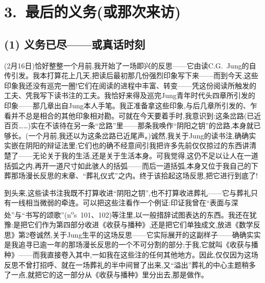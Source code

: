 
\section{3.~最后的义务(或那次来访)}

\subsection{(1) 义务已尽——或真话时刻}


\dmark{}(2月16日)恰好整整一个月前,我开始了一场即兴的反思——它由读C.G.~Jung的自传引发。我本打算花上几天,把读后最初那几份强烈印象写下来——而到今天,这些印象我还没有巡完一圈!它们在阅读的进程中丰富、转变——凭这份阅读所触发的工夫、凭我写下读书注的工夫。我恰好来得及巡完Jung青年时代头四章所引发的印象——那几章出自Jung本人手笔。我正准备拿这些印象,与后几章所引发的、乍看并不总是相合的其他印象相对勘。可就在今天要着手时,我意识到:这条岔路(已近百页……)实在不该待在另一条“岔路”里——那条我唤作“阴阳之钥”的岔路,本身就已够长。(一个月前,我还以为这条岔路已近尾声。)诚然,我关于Jung的读书注,确确实实嵌在阴阳的辩证法里;它们也的确不经意间引我把许多先前仅仅掠过的东西讲清楚了——无论关于我的生活,还是关于生活本身。可我觉得,这仍不足以让人在一道括弧之内,再开一道尺寸如此骇人的括弧——而后一道括弧,本身又位于我自己的下葬那场漫长反思的末章、“葬礼仪式”之内。终于该拾起这场反思,把它进行到底了!

到头来,这些读书注我既不打算收进“阴阳之钥”,也不打算收进葬礼——它与葬礼只有一线相当微弱的牵连。可以把这些注看作一个例证:印证我曾在“表面与深处”与“书写的颂歌”(n\textsuperscript{o}s~101、102)等注里,以一般措辞试图表达的东西。我还在犹豫:是把它们作为第四部分收进《收获与播种》,还是把它们单独成文,放进《数学反思》第2卷\dmark{}诚然,关于Jung生平的这场反思——它实际展开的这副样子——确确实实是我追寻已逾一年的那场漫长反思的一个不可分割的部分;于我,它就叫《收获与播种》——而我直接卷入其中,一如我在这些注的任何其他地方。因此,仅仅因为这场反思不曾打招呼、就在一场葬礼的半中间冒了出来,又“溢出”葬礼的中心主题稍多了一点,就把它的这一部分从《收获与播种》里分出去,那是做作。

